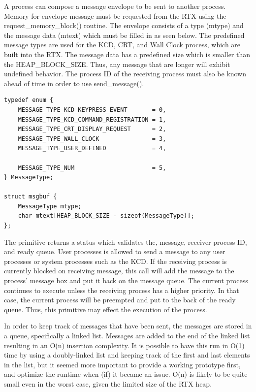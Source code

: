 \documentclass[12pt]{report}
\begin{document}
\par A process can compose a message envelope to be sent to another process. Memory for envelope message must be requested from the RTX using the request\_memory\_block() routine. The envelope consists of a type (mtype) and the message data (mtext) which must be filled in as seen below. The predefined message types are used for the KCD, CRT, and Wall Clock process, which are built into the RTX. The message data has a predefined size which is smaller than the HEAP\_BLOCK\_SIZE. Thus, any message that are longer will exhibit undefined behavior. The process ID of the receiving process must also be known ahead of time in order to use send\_message().
\newline
\begin{lstlisting}
typedef enum {
    MESSAGE_TYPE_KCD_KEYPRESS_EVENT       = 0,
    MESSAGE_TYPE_KCD_COMMAND_REGISTRATION = 1,
    MESSAGE_TYPE_CRT_DISPLAY_REQUEST      = 2,
    MESSAGE_TYPE_WALL_CLOCK               = 3,
    MESSAGE_TYPE_USER_DEFINED             = 4,

    MESSAGE_TYPE_NUM                      = 5,
} MessageType;

struct msgbuf {
    MessageType mtype;
    char mtext[HEAP_BLOCK_SIZE - sizeof(MessageType)];
};
\end{lstlisting}
\par The primitive returns a status which validates the, message, receiver process ID, and ready queue. User processes is allowed to send a message to any user processes or system processes such as the KCD. If the receiving process is currently blocked on receiving message, this call will add the message to the process' message box and put it back on the message queue. The current process continues to execute unless the receiving process has a higher priority. In that case, the current process will be preempted and put to the back of the ready queue. Thus, this primitive may effect the execution of the process.

\par In order to keep track of messages that have been sent, the messages are stored in a queue, specifically a linked list. Messages are added to the end of the linked list resulting in an O(n) insertion complexity. It is possible to have this run in O(1) time by using a doubly-linked list and keeping track of the first and last elements in the list, but it seemed more important to provide a working prototype first, and optimize the runtime when (if) it became an issue. O(n) is likely to be quite small even in the worst case, given the limited size of the RTX heap.
\newline
\end{document}
